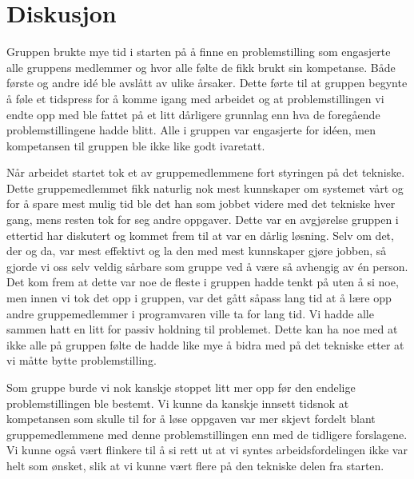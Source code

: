 
\chapter{Diskusjon} %

\label{ch:diskusjon} %







Gruppen brukte mye tid i starten på å finne en problemstilling som engasjerte alle gruppens medlemmer og hvor alle følte de fikk brukt sin kompetanse. Både første og andre idé ble avslått av ulike årsaker. Dette førte til at gruppen begynte å føle et tidspress for å komme igang med arbeidet og at problemstillingen vi endte opp med ble fattet på et litt dårligere grunnlag enn hva de foregående problemstillingene hadde blitt. Alle i gruppen var engasjerte for idéen, men kompetansen til gruppen ble ikke like godt ivaretatt. 

Når arbeidet startet tok et av gruppemedlemmene fort styringen på det tekniske. Dette gruppemedlemmet fikk naturlig nok mest kunnskaper om systemet vårt og for å spare mest mulig tid ble det han som jobbet videre med det tekniske hver gang, mens resten tok for seg andre oppgaver. Dette var en avgjørelse gruppen i ettertid har diskutert og kommet frem til at var en dårlig løsning. Selv om det, der og da, var mest effektivt og la den med mest kunnskaper gjøre jobben, så gjorde vi oss selv veldig sårbare som gruppe ved å være så avhengig av én person. Det kom frem at dette var noe de fleste i gruppen hadde tenkt på uten å si noe, men innen vi tok det opp i gruppen, var det gått såpass lang tid at å lære opp andre gruppemedlemmer i programvaren ville ta for lang tid. Vi hadde alle sammen hatt en litt for passiv holdning til problemet. Dette kan ha noe med at ikke alle på gruppen følte de hadde like mye å bidra med på det tekniske etter at vi måtte bytte problemstilling. 

Som gruppe burde vi nok kanskje stoppet litt mer opp før den endelige problemstillingen ble bestemt. Vi kunne da kanskje innsett tidsnok at kompetansen som skulle til for å løse oppgaven var mer skjevt fordelt blant gruppemedlemmene med denne problemstillingen enn med de tidligere forslagene. Vi kunne også vært flinkere til å si rett ut at vi syntes arbeidsfordelingen ikke var helt som ønsket, slik at vi kunne vært flere på den tekniske delen fra starten. 

